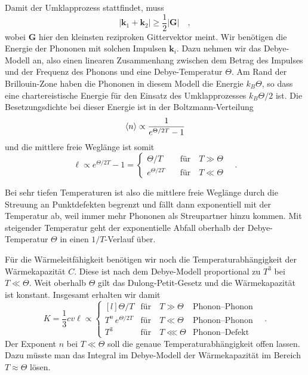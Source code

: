 Damit der Umklapprozess stattfindet, muss
\begin{equation}
    | \mathbf{k}_1 +  \mathbf{k}_2| \ge \frac{1}{2} | \mathbf{G} | \quad ,
\end{equation}
wobei $\mathbf{G}$ hier den kleinsten reziproken Gittervektor meint. Wir benötigen die Energie der Phononen mit solchen Impulsen $\mathbf{k}_i$. Dazu nehmen wir das Debye-Modell an, also einen linearen Zusammenhang zwischen dem Betrag des Impulses und der Frequenz des Phonons und eine Debye-Temperatur $\Theta$.  Am Rand der Brillouin-Zone haben die Phononen in diesem Modell die Energie $k_B \Theta$, so dass eine chartereistische Energie für den Einsatz des Umklapprozesses $k_B \Theta / 2$ ist. Die Besetzungsdichte bei dieser Energie ist in der Boltzmann-Verteilung
\begin{equation}
    \braket{n} \propto \frac{1}{e^{\Theta / 2T} -1}
\end{equation}
und die mittlere freie Weglänge ist somit
\begin{equation}
    \ell \propto e^{\Theta / 2T} -1 = 
    \left\{
    \begin{matrix*}
        \Theta / T             & \text{für} \quad T \gg \Theta  \\     
        e^{\Theta / 2T} \quad & \text{für} \quad T \ll \Theta 
    \end{matrix*}
    \right. \quad .
\end{equation}

Bei sehr tiefen Temperaturen ist also die mittlere freie Weglänge durch die Streuung an Punktdefekten begrenzt und fällt dann exponentiell mit der Temperatur ab, weil immer mehr Phononen als Streupartner hinzu kommen. Mit steigender Temperatur geht der exponentielle Abfall oberhalb der Debye-Temperatur $\Theta$ in einen $1/T$-Verlauf über.


Für die Wärmeleitfähigkeit benötigen wir noch die Temperaturabhängigkeit der Wärmekapazität $C$. Diese ist nach dem Debye-Modell proportional zu $T^3$ bei $T \ll \Theta$. Weit oberhalb $\Theta$ gilt das Dulong-Petit-Gesetz und die Wärmekapazität ist konstant. Insgesamt erhalten wir damit 
\begin{equation}
    K = \frac{1}{3} c v \ell  \propto 
    \left\{
    \begin{matrix*}[l]
        \Theta / T                    & \text{für} \quad T \gg \Theta    & \text{Phonon--Phonon}      \\
      T^n \,  e^{\Theta / 2T}        & \text{für} \quad T \ll \Theta    & \text{Phonon--Phonon}      \\
      T^3                            & \text{für} \quad T \lll \Theta   & \text{Phonon--Defekt}     
    \end{matrix*}
    \right. \quad .
\end{equation}
Der Exponent $n$ bei $ T \ll \Theta  $ soll die genaue Temperaturabhängigkeit offen lassen. Dazu müsste man das Integral im Debye-Modell der Wärmekapazität im Bereich $T \approx \Theta$ lösen. 

